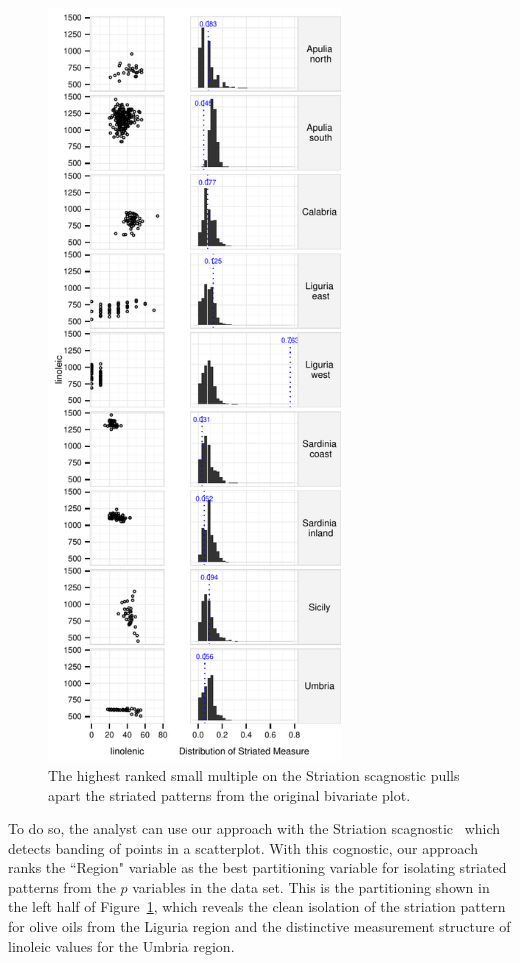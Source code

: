 \begin{figure}[t]
 \centering 
	\includegraphics[width=3.05in]{images/15_729035813077-region.pdf}
	  \caption{The highest ranked small multiple on the Striation scagnostic pulls apart the striated patterns from the original bivariate plot. }
	 \label{fig:vrich_sm}
\end{figure}

To do so, the analyst can use our approach with the Striation scagnostic~\cite{Wilkinson2005} which detects banding of points in a scatterplot. With this cognostic, our approach ranks the ``Region" variable as the best partitioning variable for isolating striated patterns from the $p$ variables in the data set. This is the partitioning shown in the left half of Figure~\ref{fig:vrich_sm}, which reveals the clean isolation of the striation pattern for olive oils from the Liguria region and the distinctive measurement structure of linoleic values for the Umbria region.


